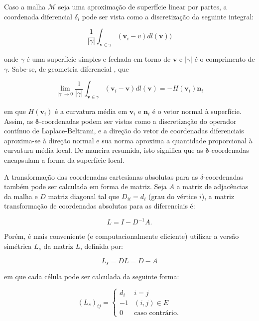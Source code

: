 Caso a malha $\mathcal{M}$ seja uma aproximação de superfície linear por partes, a coordenada diferencial $\delta_i$ pode ser vista como a discretização da seguinte integral:

\begin{equation}
	\frac{1}{|\gamma|} \int_{\mathbf{v} \in \gamma} (\mathbf{v}_i - v) dl(\mathbf{v}))
\end{equation}

\noindent onde $\gamma$ é uma superfície simples e fechada em torno de $\mathbf{v}$ e $|\gamma|$ é o comprimento de $\gamma$. Sabe-se, de geometria diferencial \cite{manfredo2014}, que

\begin{equation}
	\lim_{|\gamma| \rightarrow 0} \frac{1}{|\gamma|} \int_{\mathbf{v} \in \gamma} (\mathbf{v}_i - \mathbf{v}) dl(\mathbf{v}) = -H(\mathbf{v}_i)\mathbf{n}_i
\end{equation}

\noindent em que $H(\mathbf{v}_i)$ é a curvatura média em $\mathbf{v}_i$ e $\mathbf{n}_i$ é o vetor normal à superfície. Assim, as $\mathbf{\delta}$-coordenadas podem ser vistas como a discretização do operador contínuo de Laplace-Beltrami, e a direção do vetor de coordenadas diferenciais aproxima-se à direção normal e sua norma aproxima a quantidade proporcional à curvatura média local. De maneira resumida, isto significa que as $\mathbf{\delta}$-coordenadas encapsulam a forma da superfície local.

A transformação das coordenadas cartesianas absolutas para as $\delta$-coordenadas também pode ser calculada em forma de matriz. Seja $A$ a matriz de adjacências da malha e $D$ matriz diagonal tal que $D_{ii} = d_i$ (grau do vértice $i$), a matriz transformação de coordenadas absolutas para as diferenciais é:

\begin{equation}
	L = I - D^{-1}A.
\end{equation}

Porém, é mais conveniente (e computacionalmente eficiente) utilizar a versão simétrica $L_s$ da matriz $L$, definida por:

\begin{equation}\label{eqMatLaplaciana}
	L_s = DL = D - A
\end{equation}

\noindent em que cada célula pode ser calculada da seguinte forma:

\begin{equation}
	(L_s)_{ij} = \begin{cases}
		d_i&i=j\\
		-1&(i, j) \in E\\
		0&\text{caso contrário.}
	\end{cases}
\end{equation}

